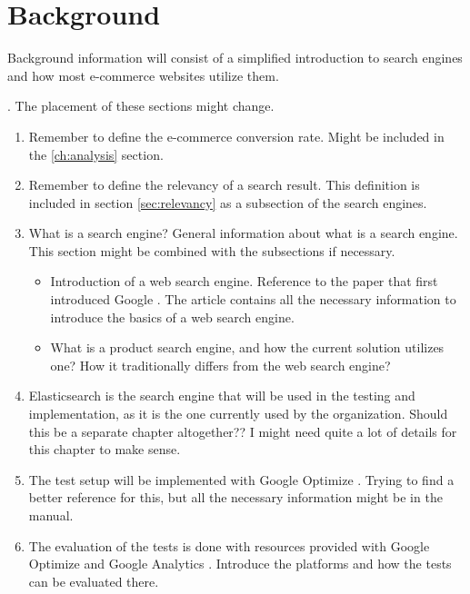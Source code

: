
\chapter{Background}
\label{ch:background}

Background information will consist of a simplified introduction to search engines and 
how most e-commerce websites utilize them. 

.
The placement of these sections might change.
\begin{enumerate}
    \item Remember to define the e-commerce conversion rate. Might be included in the \ref{ch:analysis} section.
    
    \item Remember to define the relevancy of a search result. This definition is included in section \ref{sec:relevancy} as a subsection of the search engines.

    \item What is a search engine? 
    General information about what is a search engine. 
    This section might be combined with the subsections if necessary.
    
    \begin{itemize}
        \item Introduction of a web search engine. Reference to the paper that first introduced Google \cite{googleInit}. 
        The article contains all the necessary information to introduce the basics of a web search engine.
    
        \item What is a product search engine, and how the current solution utilizes one? 
        How it traditionally differs from the web search engine?
        
    \end{itemize}

    \item Elasticsearch \cite{elasticIntro, relevantSearch} is the search engine that will be used in the testing and implementation, 
    as it is the one currently used by the organization.
    Should this be a separate chapter altogether?? I might need quite a lot of details for this chapter to make sense.
    
    \item The test setup will be implemented with Google Optimize \cite{optimizeAbout}. 
    Trying to find a better reference for this, but all the necessary information might be in the manual.
    
    \item The evaluation of the tests is done with resources provided with Google Optimize and Google Analytics \cite{optimizeAbout, analyticsAbout}. 
    Introduce the platforms and how the tests can be evaluated there.
    
\end{enumerate}

